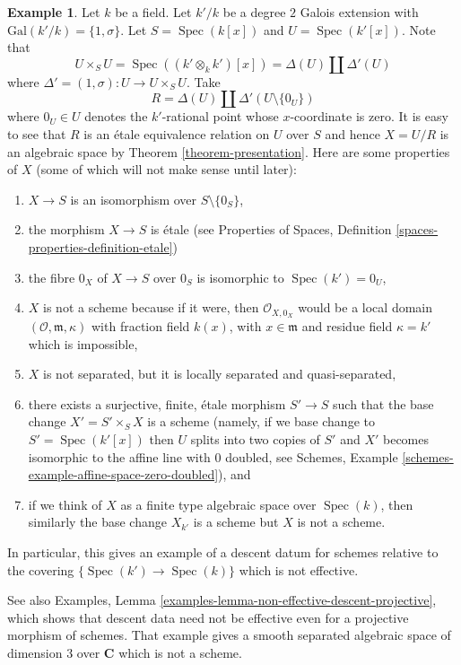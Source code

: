 \documentclass{stacks-project}
\theoremstyle{plain}
\theoremstyle{definition}
\newtheorem{example}[subsection]{Example}
\theoremstyle{remark}
\numberwithin{equation}{subsection}
\def\Spec{\mathop{\mathrm{Spec}}}
\begin{document}
\begin{example}
\label{example-non-representable-descent}
Let $k$ be a field. Let $k'/k$ be a degree $2$ Galois extension
with $\text{Gal}(k'/k) = \{1, \sigma\}$. Let $S = \Spec(k[x])$
and $U = \Spec(k'[x])$. Note that
$$
U \times_S U =
\Spec((k' \otimes_k k')[x]) =
\Delta(U) \amalg \Delta'(U)
$$
where $\Delta' = (1, \sigma) : U \to U \times_S U$. Take
$$
R = \Delta(U) \amalg \Delta'(U \setminus \{0_U\})
$$
where $0_U \in U$ denotes the $k'$-rational point whose $x$-coordinate is zero.
It is easy to see that $R$ is an \'etale equivalence relation on $U$ over $S$
and hence $X = U/R$ is an algebraic space by
Theorem \ref{theorem-presentation}. Here are some properties of $X$ (some
of which will not make sense until later):
\begin{enumerate}
\item $X \to S$ is an isomorphism over $S \setminus \{0_S\}$,
\item the morphism $X \to S$ is \'etale (see
Properties of Spaces,
Definition \ref{spaces-properties-definition-etale})
\item the fibre $0_X$ of $X \to S$ over $0_S$ is isomorphic to
$\Spec(k') = 0_U$,
\item $X$ is not a scheme because if it were, then $\mathcal{O}_{X, 0_X}$
would be a local domain $(\mathcal{O}, \mathfrak m, \kappa)$ with
fraction field $k(x)$, with $x \in \mathfrak m$ and residue field
$\kappa = k'$ which is impossible,
\item $X$ is not separated, but it is
locally separated and quasi-separated,
\item there exists a surjective, finite, \'etale morphism $S' \to S$
such that the base change $X' = S' \times_S X$ is a scheme (namely, if
we base change to $S' = \Spec(k'[x])$ then $U$ splits into
two copies of $S'$ and $X'$ becomes isomorphic to the affine line with
$0$ doubled, see
Schemes, Example \ref{schemes-example-affine-space-zero-doubled}), and
\item if we think of $X$ as a finite type algebraic space over
$\Spec(k)$, then similarly the base change $X_{k'}$ is a scheme
but $X$ is not a scheme.
\end{enumerate}
In particular, this gives an example of a descent datum for schemes
relative to the covering $\{\Spec(k') \to \Spec(k)\}$
which is not effective.
\end{example}

\noindent
See also Examples, 
Lemma \ref{examples-lemma-non-effective-descent-projective},
which shows that descent data need not be effective
even for a projective morphism of schemes. That example
gives a smooth separated algebraic space of dimension 3
over ${\mathbf C}$ which is not a scheme.
\end{document}
